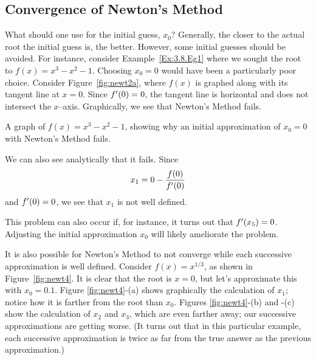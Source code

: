 \subsection{Convergence of Newton's Method}

What should one use for the initial guess, $x_0$?  Generally, the closer to the actual root the initial guess is, the better.  However, some initial guesses should be avoided.  For instance, consider Example~\ref{Ex:3.8.Eg1} where we sought the root to $f(x) = x^3-x^2-1$.  Choosing  $x_0=0$ would have been a particularly poor choice. Consider Figure~\ref{fig:newt2a}, where $f(x)$ is graphed along with its tangent line at $x=0$. Since $f'(0)=0$, the tangent line is horizontal and does not intersect the $x$--axis. Graphically, we see that Newton's Method fails.

\begin{marginfigure}[-13cm] %
\caption{A graph of $f(x) = x^3-x^2-1$, showing why an initial approximation of $x_0=0$ with Newton's Method fails.}\label{fig:newt2a}
\end{marginfigure}

We can also see analytically that it fails. Since $$x_1 = 0 -\frac{f(0)}{f'(0)}$$ and $f'(0)=0$, we see that $x_1$ is not well defined.  

This problem can also occur if, for instance, it turns out that $f'(x_5)=0$. Adjusting the initial approximation $x_0$ will likely ameliorate the problem.

It is also possible for Newton's Method to not converge while each successive approximation is well defined. Consider $f(x) = x^{1/3}$, as shown in Figure~\ref{fig:newt4}. It is clear that the root is $x=0$, but let's approximate this with $x_0=0.1$. Figure \ref{fig:newt4}-(a) shows graphically the calculation of $x_1$; notice how it is farther from the root than $x_0$. Figures \ref{fig:newt4}-(b) and -(c) show the calculation of $x_2$ and $x_3$, which are even farther away; our successive approximations are getting worse. (It turns out that in this particular example, each successive approximation is twice as far from the true answer as the previous approximation.)

